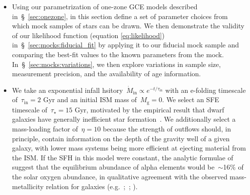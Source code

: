 \documentclass[ms.tex]{subfiles}
\begin{document}
\begin{itemize}

	\item Using our parametrization of one-zone GCE models described
	in~\S~\ref{sec:onezone}, in this section define a set of parameter choices
	from which mock samples of stars can be drawn.
	We then demonstrate the validity of our likelihood function (equation
	\ref{eq:likelihood}) in~\S~\ref{sec:mocks:fiducial_fit} by applying it to
	our fiducial mock sample and comparing the best-fit values to the known
	parameters from the mock.
	In~\S~\ref{sec:mocks:variations}, we then explore variations in sample
	size, measurement precision, and the availability of age information.


	\item We take an exponential infall hsitory~$\dot{M}_\text{in} \propto
	e^{-t/\tau_\text{in}}$ with an e-folding timescale of~$\tau_\text{in} = 2$
	Gyr and an initial ISM mass of~$M_\text{g} = 0$.
	We select an SFE timescale of~$\tau_\star = 15$ Gyr, motivated by the
	empirical result that dwarf galaxies have generally inefficient star
	formation~\citep[e.g.][]{Hudson2015}.
	We additionally select a mass-loading factor of~$\eta = 10$ because the
	strength of outflows should, in principle, contain information on the depth
	of the gravity well of a given galaxy, with lower mass systems being more
	efficient at ejecting material from the ISM.
	If the SFH in this model were constant, the analytic formulae of
	\citet{Weinberg2017} suggest that the equilibrium abundance of alpha
	elements would be~$\sim$16\% of the solar oxygen abundance, in qualitative
	agreement with the observed mass-metallicity relation for galaxies
	(e.g.~\citealp{Andrews2013, Tremonti2004};~\citealp*{Zahid2011};
	\citealp{Zahid2014}).


\end{itemize}
\end{document}
